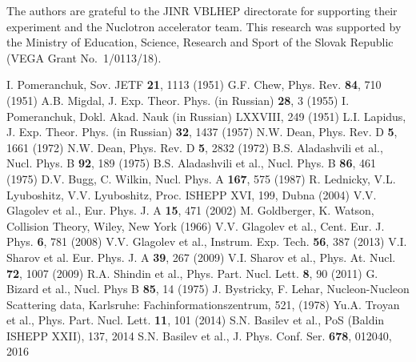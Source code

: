\documentclass[twocolumn,epjc3]{svjour3}
\begin{document}
\begin{acknowledgements}
  The authors are grateful to the JINR VBLHEP directorate for supporting their
  experiment and the Nuclotron accelerator team. This research was supported by
  the Ministry of Education, Science, Research and Sport of the Slovak Republic
  (VEGA Grant No.~1/0113/18).
\end{acknowledgements}

\begin{thebibliography}{99}
  I. Pomeranchuk, Sov. JETF \textbf{21}, 1113 (1951)
  G.F. Chew, Phys. Rev. \textbf{84}, 710 (1951)
  A.B. Migdal, J. Exp. Theor. Phys. (in Russian) \textbf{28}, 3 (1955)
  I. Pomeranchuk, Dokl. Akad. Nauk (in Russian) LXXVIII, 249 (1951)
  L.I. Lapidus, J. Exp. Theor. Phys. (in Russian) \textbf{32}, 1437 (1957)
  N.W. Dean, Phys. Rev. D \textbf{5}, 1661 (1972)
  N.W. Dean, Phys. Rev. D \textbf{5}, 2832 (1972)
  B.S. Aladashvili et al., Nucl. Phys. B \textbf{92}, 189 (1975)
  B.S. Aladashvili et al., Nucl. Phys. B \textbf{86}, 461 (1975)
  D.V. Bugg, C. Wilkin, Nucl. Phys. A \textbf{167}, 575 (1987)
  R. Lednicky, V.L. Lyuboshitz, V.V. Lyuboshitz, Proc. ISHEPP XVI, 199,
  Dubna (2004)
  V.V. Glagolev et al., Eur. Phys. J. A \textbf{15}, 471 (2002)
  M. Goldberger, K. Watson, Collision Theory, Wiley, New York (1966)
  V.V. Glagolev et al., Cent. Eur. J. Phys. \textbf{6}, 781 (2008)
  V.V. Glagolev et al., Instrum. Exp. Tech. \textbf{56}, 387 (2013)
  V.I. Sharov et al. Eur. Phys. J. A \textbf{39}, 267 (2009)
  V.I. Sharov et al., Phys. At. Nucl. \textbf{72}, 1007 (2009)
  R.A. Shindin et al., Phys. Part. Nucl. Lett. \textbf{8}, 90 (2011)
  G. Bizard et al., Nucl. Phys B \textbf{85}, 14 (1975)
  J. Bystricky, F. Lehar, Nucleon-Nucleon Scattering data, Karlsruhe:
  Fachinformationszentrum, 521, (1978)
  Yu.A. Troyan et al., Phys. Part. Nucl. Lett. \textbf{11}, 101 (2014)
  S.N. Basilev et al., PoS (Baldin ISHEPP XXII), 137, 2014
  S.N. Basilev et al., J. Phys. Conf. Ser. \textbf{678}, 012040, 2016
\end{thebibliography}
\end{document}
